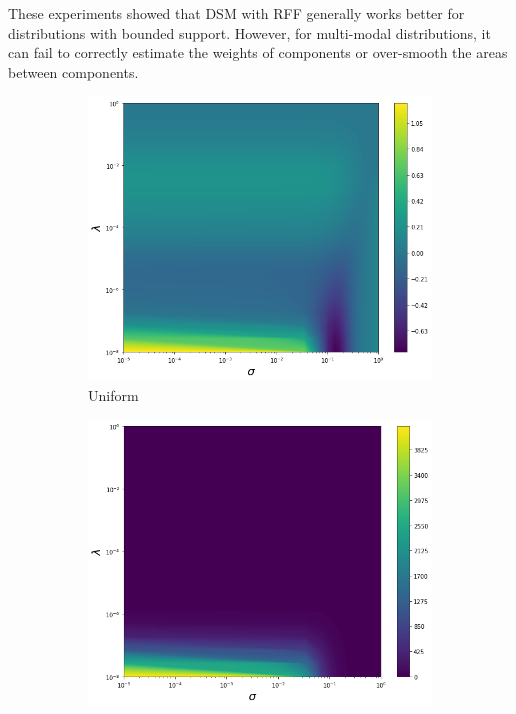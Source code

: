 These experiments showed that DSM with RFF generally works better for distributions with bounded support.
However, for multi-modal distributions, it can fail to correctly estimate the weights of
components or over-smooth the areas between components.
\begin{figure}[!ht]
  \centering
  \begin{subfigure}[b]{0.32\textwidth}
    \includegraphics[width=\textwidth]{figures/score_matching/loss/lossUniform.png}
    \caption{Uniform}
  \end{subfigure}
  \begin{subfigure}[b]{0.32\textwidth}
    \includegraphics[width=\textwidth]{figures/score_matching/loss/lossFunnel.png}

\end{subfigure}
\end{figure}
